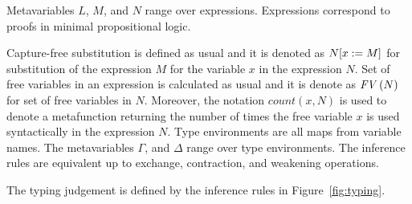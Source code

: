 Metavariables $L$, $M$, and $N$ range over expressions. Expressions
correspond to proofs in minimal propositional logic.


Capture-free substitution is defined as usual and it is denoted as
$N[x:=M]$ for substitution of the expression $M$ for the variable
$x$ in the expression $N$. Set of free variables in an expression is
calculated as usual and it is denote as $\text{\textit{FV}}\,(N)$ for set of free
variables in $N$. Moreover, the notation $count(x,N)$ is used to denote a
metafunction returning the number of times the free variable $x$ is
used syntactically in the expression $N$.
Type %
 environments are all maps from
variable names. The metavariables $\Gamma$, and $\Delta$ range over
type environments.  The inference rules are equivalent up to exchange,
contraction, and weakening operations.

The typing judgement is defined by the inference rules in
Figure~\ref{fig:typing}.

